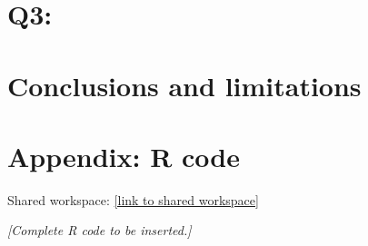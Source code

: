 \documentclass[11pt,a4paper]{article}
\begin{document}
\section{Q3:}


\section{Conclusions and limitations}



\clearpage
\appendix
\section*{Appendix: R code}

Shared workspace: \url{[link to shared workspace]}

% 
\textit{[Complete R code to be inserted.]}
\end{document}
